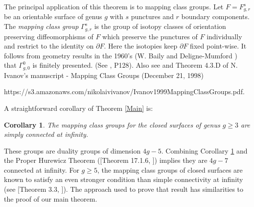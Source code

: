 \documentclass[12pt]{article}
\newtheorem{corollary}[theorem]{Corollary}
\numberwithin{equation}{section}
\begin{document}
The principal application of this theorem is to mapping class groups. Let $F=F_{g,r}^s$ be an orientable surface of genus $g$ with $s$ punctures and $r$ boundary components. The {\it mapping class group} $\Gamma_{g,r}^s$  is the group of isotopy classes of orientation preserving diffeomorphisms of $F$ which preserve the punctures of $F$ individually and restrict to the identity on $\partial F$. Here the isotopies keep $\partial F$ fixed point-wise. It follows from geometry results in the 1960's (W. Baily \cite{B60} and Deligne-Mumford \cite{DM69}) that $\Gamma_{g,0}^0$ is finitely presented. (See \cite{FM12}, P128).
Also see \cite{McC75} and Theorem 4.3.D of N. Ivanov's manuscript - Mapping Class Groups (December 21, 1998) 

\noindent https://s3.amazonaws.com/nikolaivivanov/Ivanov1999MappingClassGroups.pdf. 

A straightforward corollary of Theorem \ref{Main} is:
\begin{corollary} \label{MCG34}
The mapping class groups for the closed surfaces of genus $g\geq 3$ are simply connected at infinity.
\end{corollary}
These groups are duality groups of dimension $4g-5$. Combining Corollary \ref{MCG34} and the Proper Hurewicz Theorem  ([Theorem 17.1.6, \cite{G}]) implies they are $4g-7$ connected at infinity. For $g\geq 5$, the mapping class groups of closed surfaces are known to satisfy an even stronger condition than simple connectivity at infinity (see  [Theorem 3.3, \cite{ABDDY12}]). The approach used to prove that result has similarities to the proof of our main theorem.
 
\end{document}
